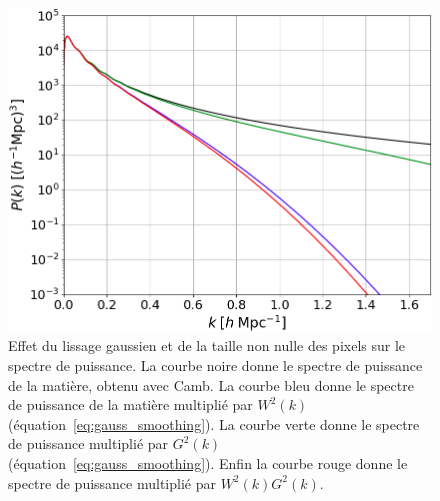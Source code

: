 \begin{figure}
  \centering
  \includegraphics[scale=0.35]{pk_smoothing}
  \caption{Effet du lissage gaussien et de la taille non nulle des pixels sur le spectre de puissance. La courbe noire donne le spectre de puissance de la matière, obtenu avec Camb. La courbe bleu donne le spectre de puissance de la matière multiplié par $W^2(k)$ (équation~\ref{eq:gauss_smoothing}). La courbe verte donne le spectre de puissance multiplié par $G^2(k)$ (équation~\ref{eq:gauss_smoothing}). Enfin la courbe rouge donne le spectre de puissance multiplié par $W^2(k) G^2(k)$.}
  \label{fig:pk_smoothing}
\end{figure}
